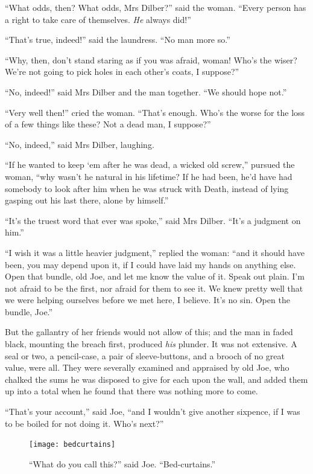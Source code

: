 \documentclass[paper=5.5in:8.5in,BCOR=7mm,twoside,DIV=calc,12pt,usegeometry]{scrbook} %
\begin{document}
\enquote{What odds, then? What odds, Mrs Dilber?} said the woman. \enquote{Every person has a right to take care of themselves. \textit{He} always did!}

\enquote{That's true, indeed!} said the laundress. \enquote{No man more so.}

\enquote{Why, then, don't stand staring as if you was afraid, woman! Who's the wiser? We're not going to pick holes in each other's coats, I suppose?}

\enquote{No, indeed!} said Mrs Dilber and the man together. \enquote{We should hope not.}

\enquote{Very well then!} cried the woman. \enquote{That's enough. Who's the worse for the loss of a few things like these? Not a dead man, I suppose?}

\enquote{No, indeed,} said Mrs Dilber, laughing.

\enquote{If he wanted to keep `em after he was dead, a wicked old screw,} pursued the woman, \enquote{why wasn't he natural in his lifetime? If he had been, he'd have had somebody to look after him when he was struck with Death, instead of lying gasping out his last there, alone by himself.}

\enquote{It's the truest word that ever was spoke,} said Mrs Dilber. \enquote{It's a judgment on him.}

\enquote{I wish it was a little heavier judgment,} replied the woman: \enquote{and it should have been, you may depend upon it, if I could have laid my hands on anything else. Open that bundle, old Joe, and let me know the value of it. Speak out plain. I'm not afraid to be the first, nor afraid for them to see it. We knew pretty well that we were helping ourselves before we met here, I believe. It's no sin. Open the bundle, Joe.}

But the gallantry of her friends would not allow of this; and the man in faded black, mounting the breach first, produced \textit{his} plunder. It was not extensive. A seal or two, a pencil-case, a pair of sleeve-buttons, and a brooch of no great value, were all. They were severally examined and appraised by old Joe, who chalked the sums he was disposed to give for each upon the wall, and added them up into a total when he found that there was nothing more to come.

\enquote{That's your account,} said Joe, \enquote{and I wouldn't give another sixpence, if I was to be boiled for not doing it. Who's next?}

\begin{figure}[p]
\begin{minipage}[c]{\linewidth}
\texttt{[image: bedcurtains]}
\caption[\enquote{What do you call this?} said Joe. \enquote{Bed-curtains.}]{\enquote{What do you call this?} said Joe. \enquote{Bed-curtains.}}
\end{minipage}
\end{figure}
\end{document}
